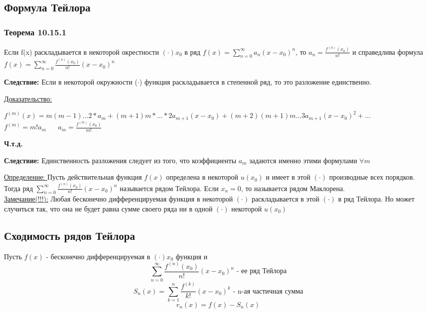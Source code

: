 \documentclass[12pt]{article}
\let\oldsum\sum
\renewcommand{\sum}{\oldsum\limits}
\begin{document}
    \subsection{Формула Тейлора}
    \subsubsection*{Теорема 10.15.1}\label{th:10.15.1}
    \par\noindent
    Если f(x) раскладывается в некоторой окрестности $(\cdot) x_0$ в ряд $f(x)=\sum_{n=0}^{\infty}a_n(x-x_0)^n$,
    то $a_n=\frac{f^{(n)}(x_0)}{n!}$ и справедлива формула
    $f(x)=\sum_{n=0}^{\infty} \frac{f^{(n)}(x_0)}{n!}(x-x_0)^n$

    \textbf{Следствие: } Если в некоторой окружности ($\cdot$) функция раскладывается в степенной ряд,
    то это разложение единственно.

    \underline{Доказательство:}
    \begin{adjustwidth}{1.5em}{1.5em}
      $f^{(m)}(x)=m(m-1)\dots2*a_m+(m+1)m*\dots*2a_{m+1}(x-x_0)+(m+2)(m+1)m\dots 3a_{m+1}(x-x_0)^2+\dots$\\
      $f^{(m)}=m!a_m \hspace{20pt} a_m=\frac{f^{(m)}(x_0)}{m!}$
    \end{adjustwidth}
    \begin{center}
      \textbf{Ч.т.д.}
    \end{center}

    \textbf{Следствие:} Единственность разложения следует из того, что коэффициенты $a_m$ задаются
    именно этими формулами $\forall m$

    \underline{Определение: } Пусть действительная функция $f(x)$ определена в некоторой $u(x_0)$ и
    имеет в этой $(\cdot)$ производные всех порядков. Тогда ряд $\sum_{n=0}^{\infty} \frac{f^{(n)}(x_0)}{n!}
    (x-x_0)^n$ называется рядом Тейлора. Если $x_n=0$, то называется рядом Маклорена.\\

    \underline{Замечание(!!!):}
    Любая бесконечно дифференцируемая функция в некоторой $(\cdot)$ раскладывается в этой $(\cdot)$ в ряд Тейлора.
    Но может случиться так, что она не будет равна сумме своего ряда ни в одной $(\cdot)$ некоторой $u(x_0)$

    \subsection*{Сходимость рядов Тейлора}
    Пусть $f(x)$ - бесконечно дифференцируемая в $(\cdot) x_0$ функция и 
    \[\sum_{n=0}^{\infty} \frac{f^{(n)}(x_0)}{n!}(x-x_0)^n \text{ - ее ряд Тейлора}\]
    \[S_n(x)=\sum_{k=1}^{n} \frac{f^{(k)}}{k!}(x-x_0)^k\text{ - n-ая частичная сумма}\]
    \[r_n(x)=f(x)-S_n(x)\]
    
\end{document}
